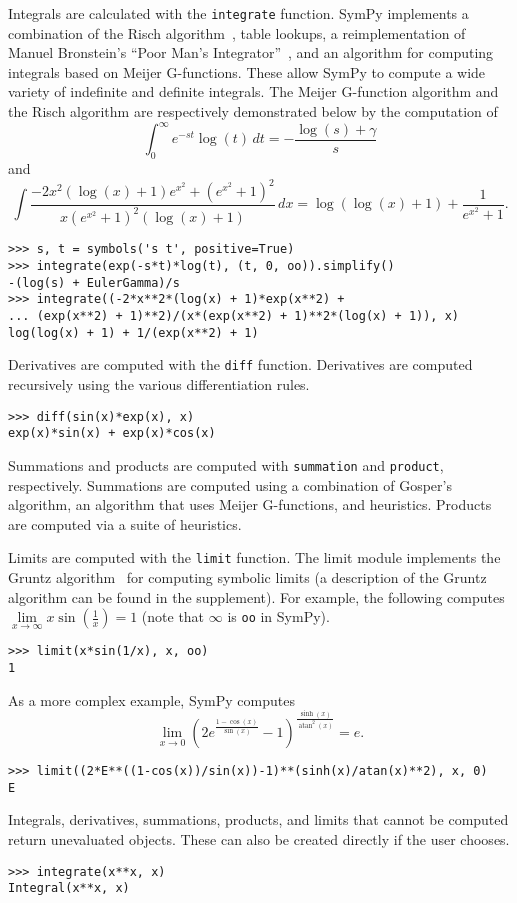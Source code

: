 Integrals are calculated with the \verb|integrate| function. SymPy
implements a combination of the Risch
algorithm~\cite{bronstein2005integration}, table lookups, a reimplementation
of Manuel Bronstein's ``Poor Man's Integrator''~\cite{Bronstein2005pmint}, and
an algorithm for computing integrals based on Meijer G-functions. These allow
SymPy to compute a wide variety of indefinite and definite integrals. The
Meijer G-function algorithm and the Risch algorithm are respectively
demonstrated below by the computation of $$\int_{0}^{\infty} e^{-s t}\log{\left
      (t \right )}\, dt = - \frac{ \log{\left (s \right
    )} + \gamma}{s}$$ and $$\int \frac{- 2 x^{2}
  \left(\log{\left (x \right )} + 1\right) e^{x^{2}} + \left(e^{x^{2}} +
    1\right)^{2}}{x \left(e^{x^{2}} + 1\right)^{2} \left(\log{\left (x \right
      )} + 1\right)}\, dx = \log{\left (\log{\left (x \right )} + 1 \right )}
+ \frac{1}{e^{x^{2}} + 1}.$$
\begin{verbatim}
>>> s, t = symbols('s t', positive=True)
>>> integrate(exp(-s*t)*log(t), (t, 0, oo)).simplify()
-(log(s) + EulerGamma)/s
>>> integrate((-2*x**2*(log(x) + 1)*exp(x**2) +
... (exp(x**2) + 1)**2)/(x*(exp(x**2) + 1)**2*(log(x) + 1)), x)
log(log(x) + 1) + 1/(exp(x**2) + 1)
\end{verbatim}

Derivatives are computed with the \verb|diff| function. Derivatives are
computed recursively using the various differentiation rules.
\begin{verbatim}
>>> diff(sin(x)*exp(x), x)
exp(x)*sin(x) + exp(x)*cos(x)
\end{verbatim}

Summations and products are computed with \verb|summation| and \verb|product|,
respectively. Summations are computed using a combination of Gosper's
algorithm, an algorithm that uses Meijer G-functions, and heuristics. Products
are computed via a suite of heuristics.

Limits are computed with the \verb|limit| function. The limit module
implements the Gruntz algorithm~\cite{Gruntz1996limits} for computing symbolic
limits (a description of the Gruntz algorithm can be found in the supplement).
For example, the following computes
$\lim\limits_{x\to \infty} x\sin(\frac{1}{x})=1$ (note that $\infty$ is
\verb|oo| in SymPy).
\begin{verbatim}
>>> limit(x*sin(1/x), x, oo)
1
\end{verbatim}
As a more complex example, SymPy computes $$\lim\limits_{x\to 0}{\left(2 e^{\frac{1 - \cos{\left (x \right )}}{\sin{\left (x \right )}}} -
  1\right)}^{\frac{\sinh{\left (x \right )}}{\operatorname{atan}^{2}{\left (x
      \right )}}} = e.$$
\begin{verbatim}
>>> limit((2*E**((1-cos(x))/sin(x))-1)**(sinh(x)/atan(x)**2), x, 0)
E
\end{verbatim}

Integrals, derivatives, summations, products, and limits that cannot be
computed return unevaluated objects. These can also be created directly if the
user chooses.
\begin{verbatim}
>>> integrate(x**x, x)
Integral(x**x, x)
\end{verbatim}
